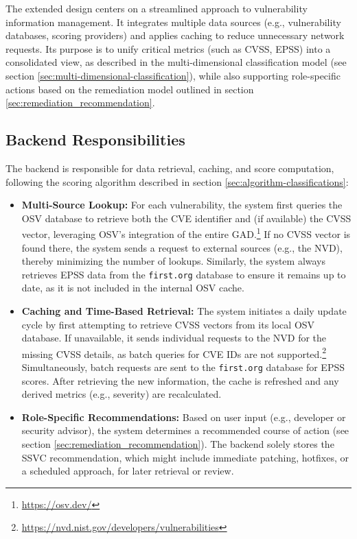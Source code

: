 The extended design centers on a streamlined approach to vulnerability information management. It integrates multiple data sources (e.g., vulnerability databases, scoring providers) and applies caching to reduce unnecessary network requests. Its purpose is to unify critical metrics (such as \ac{CVSS}, \ac{EPSS}) into a consolidated view, as described in the multi-dimensional classification model (see section \ref{sec:multi-dimensional-classification}), while also supporting role-specific actions based on the remediation model outlined in section \ref{sec:remediation_recommendation}.

\subsection{Backend Responsibilities}
\label{subsec:backend-responsibilities}

The backend is responsible for data retrieval, caching, and score computation, following the scoring algorithm described in section \ref{sec:algorithm-classifications}:
\begin{itemize}
    \item \textbf{Multi-Source Lookup:}  
    For each vulnerability, the system first queries the \ac{OSV} database to retrieve both the \ac{CVE} identifier and (if available) the \ac{CVSS} vector, leveraging \ac{OSV}'s integration of the entire \ac{GAD}.\footnote{\url{https://osv.dev/}} If no \ac{CVSS} vector is found there, the system sends a request to external sources (e.g., the \ac{NVD}), thereby minimizing the number of lookups. Similarly, the system always retrieves \ac{EPSS} data from the \texttt{first.org} database to ensure it remains up to date, as it is not included in the internal \ac{OSV} cache.
    \item \textbf{Caching and Time-Based Retrieval:}  
    The system initiates a daily update cycle by first attempting to retrieve \ac{CVSS} vectors from its local \ac{OSV} database. If unavailable, it sends individual requests to the \ac{NVD} for the missing \ac{CVSS} details, as batch queries for \ac{CVE} IDs are not supported.\footnote{\url{https://nvd.nist.gov/developers/vulnerabilities}} Simultaneously, batch requests are sent to the \texttt{first.org} database for \ac{EPSS} scores.
    After retrieving the new information, the cache is refreshed and any derived metrics (e.g., severity) are recalculated.
    \item \textbf{Role-Specific Recommendations:} Based on user input (e.g., developer or security advisor), the system determines a recommended course of action (see section \ref{sec:remediation_recommendation}). The backend solely stores the \ac{SSVC} recommendation, which might include immediate patching, hotfixes, or a scheduled approach, for later retrieval or review.
\end{itemize}

